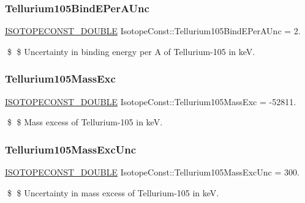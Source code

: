 \subsubsection{\texorpdfstring{Tellurium105\+Bind\+E\+Per\+A\+Unc}{Tellurium105BindEPerAUnc}}
{\footnotesize\ttfamily \mbox{\hyperlink{group___isotope_const-_macros_ga8f45a7272ce02c0b4c65c44636ed719a}{I\+S\+O\+T\+O\+P\+E\+C\+O\+N\+S\+T\+\_\+\+D\+O\+U\+B\+LE}} Isotope\+Const\+::\+Tellurium105\+Bind\+E\+Per\+A\+Unc = 2.}

\$ \$ Uncertainty in binding energy per A of Tellurium-\/105 in keV. \mbox{\label{group___isotope_const-_tellurium-_te105_ga055d5c6737c6796051f71b032893804a}} 
\subsubsection{\texorpdfstring{Tellurium105\+Mass\+Exc}{Tellurium105MassExc}}
{\footnotesize\ttfamily \mbox{\hyperlink{group___isotope_const-_macros_ga8f45a7272ce02c0b4c65c44636ed719a}{I\+S\+O\+T\+O\+P\+E\+C\+O\+N\+S\+T\+\_\+\+D\+O\+U\+B\+LE}} Isotope\+Const\+::\+Tellurium105\+Mass\+Exc = -\/52811.}

\$ \$ Mass excess of Tellurium-\/105 in keV. \mbox{\label{group___isotope_const-_tellurium-_te105_gac85792825ca3576f8b73c4bef86a2186}} 
\subsubsection{\texorpdfstring{Tellurium105\+Mass\+Exc\+Unc}{Tellurium105MassExcUnc}}
{\footnotesize\ttfamily \mbox{\hyperlink{group___isotope_const-_macros_ga8f45a7272ce02c0b4c65c44636ed719a}{I\+S\+O\+T\+O\+P\+E\+C\+O\+N\+S\+T\+\_\+\+D\+O\+U\+B\+LE}} Isotope\+Const\+::\+Tellurium105\+Mass\+Exc\+Unc = 300.}

\$ \$ Uncertainty in mass excess of Tellurium-\/105 in keV. \mbox{\label{group___isotope_const-_tellurium-_te105_ga56ee41b5ebe9d71a16418ff49b716eec}} 
